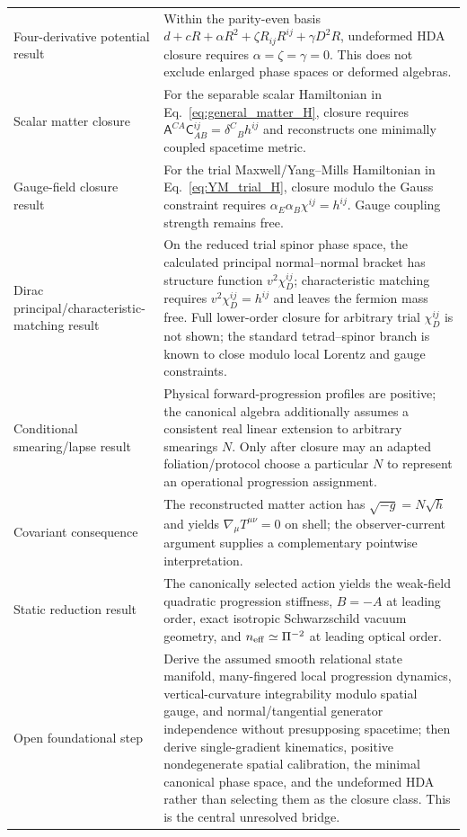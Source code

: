 \documentclass[11pt]{article}
\begin{document}
\begin{longtable}{@{}p{}p{}@{}}
Four-derivative potential result & Within the parity-even basis $d+cR+\alpha R^2+\zeta R_{ij}R^{ij}+\gamma D^2R$, undeformed HDA closure requires $\alpha=\zeta=\gamma=0$. This does not exclude enlarged phase spaces or deformed algebras. \\
Scalar matter closure & For the separable scalar Hamiltonian in Eq.~\eqref{eq:general_matter_H}, closure requires $\mathsf A^{CA}\mathsf C^{ij}_{AB}=\delta^C{}_B h^{ij}$ and reconstructs one minimally coupled spacetime metric. \\
Gauge-field closure result & For the trial Maxwell/Yang--Mills Hamiltonian in Eq.~\eqref{eq:YM_trial_H}, closure modulo the Gauss constraint requires $\alpha_E\alpha_B\chi^{ij}=h^{ij}$. Gauge coupling strength remains free. \\
Dirac principal/characteristic-matching result & On the reduced trial spinor phase space, the calculated principal normal--normal bracket has structure function $v^2\chi_D^{ij}$; characteristic matching requires $v^2\chi_D^{ij}=h^{ij}$ and leaves the fermion mass free. Full lower-order closure for arbitrary trial $\chi_D^{ij}$ is not shown; the standard tetrad--spinor branch is known to close modulo local Lorentz and gauge constraints. \\
Conditional smearing/lapse result & Physical forward-progression profiles are positive; the canonical algebra additionally assumes a consistent real linear extension to arbitrary smearings $N$. Only after closure may an adapted foliation/protocol choose a particular $N$ to represent an operational progression assignment. \\
Covariant consequence & The reconstructed matter action has $\sqrt{-g}=N\sqrt h$ and yields $\nabla_\mu T^{\mu\nu}=0$ on shell; the observer-current argument supplies a complementary pointwise interpretation. \\
Static reduction result & The canonically selected action yields the weak-field quadratic progression stiffness, $B=-A$ at leading order, exact isotropic Schwarzschild vacuum geometry, and $n_{\rm eff}\simeq\Pi^{-2}$ at leading optical order. \\
Open foundational step & Derive the assumed smooth relational state manifold, many-fingered local progression dynamics, vertical-curvature integrability modulo spatial gauge, and normal/tangential generator independence without presupposing spacetime; then derive single-gradient kinematics, positive nondegenerate spatial calibration, the minimal canonical phase space, and the undeformed HDA rather than selecting them as the closure class. This is the central unresolved bridge. \\

\end{longtable}
\end{document}
